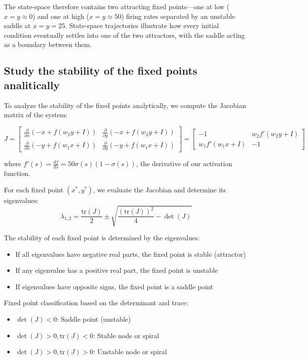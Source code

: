 \documentclass{article}
\begin{document}
  \noindent
  The state-space therefore contains two attracting fixed points—one at low (\(x=y\approx0\))
  and one at high (\(x=y\approx50\)) firing rates separated by an unstable saddle at
  \(x=y=25\).  State-space trajectories illustrate how every initial
  condition eventually settles into one of the two attractors, with the
  saddle acting as a boundary between them.

\subsection{Study the stability of the fixed points analitically}
To analyze the stability of the fixed points analytically, we compute the Jacobian matrix of the system:

\begin{equation}
J = 
\begin{bmatrix}
\frac{\partial}{\partial x}\left(-x + f(w_2 y + I)\right) & \frac{\partial}{\partial y}\left(-x + f(w_2 y + I)\right) \\
\frac{\partial}{\partial x}\left(-y + f(w_1 x + I)\right) & \frac{\partial}{\partial y}\left(-y + f(w_1 x + I)\right)
\end{bmatrix}
=
\begin{bmatrix}
-1 & w_2 f'(w_2 y + I) \\
w_1 f'(w_1 x + I) & -1
\end{bmatrix}
\end{equation}

where $f'(s) = \frac{df}{ds} = 50\sigma(s)(1 - \sigma(s))$, the derivative of our activation function.

For each fixed point $(x^*,y^*)$, we evaluate the Jacobian and determine its eigenvalues:
\[
\lambda_{1,2} = \frac{\text{tr}(J)}{2} \pm \sqrt{\frac{(\text{tr}(J))^2}{4} - \det(J)}
\]

The stability of each fixed point is determined by the eigenvalues:
\begin{itemize}
    \item If all eigenvalues have negative real parts, the fixed point is stable (attractor)
    \item If any eigenvalue has a positive real part, the fixed point is unstable
    \item If eigenvalues have opposite signs, the fixed point is a saddle point
\end{itemize}

Fixed point classification based on the determinant and trace:
\begin{itemize}
    \item $\det(J) < 0$: Saddle point (unstable)
    \item $\det(J) > 0, \text{tr}(J) < 0$: Stable node or spiral
    \item $\det(J) > 0, \text{tr}(J) > 0$: Unstable node or spiral
\end{itemize}
\end{document}
